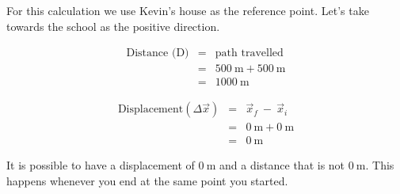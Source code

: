 For this calculation we use Kevin's house as the reference point. Let's take towards the school as the positive direction.\\
\begin{minipage}{0.5\textwidth}
\begin{eqnarray*}
\text{Distance (D)} &=& \text{path~travelled}\\
&=&500\ \text{m} + 500\ \text{m}\\
&=&1000\ \text{m}
\end{eqnarray*}
\end{minipage}
\begin{minipage}{0.5\textwidth}
\begin{eqnarray*}
\text{Displacement} (\Delta \vec{x}) &=& \vec{x}_f~ - ~ \vec{x}_i\\
&=&0\ \text{m} + 0\ \text{m}\\
&=&0\ \text{m}
\end{eqnarray*}
\end{minipage} 
      \label{m38788*id63886}It is possible to have a displacement of $0~\text{m}$ and a distance that is not $0~\text{m}$. This happens whenever you end at the same point you started. 


